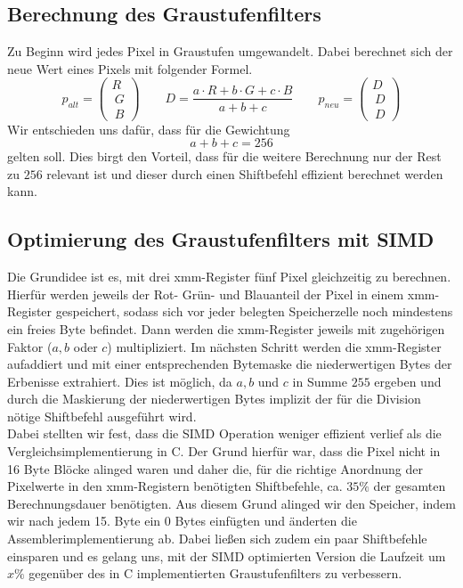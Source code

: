 \documentclass[course=erap]{aspdoc}
\begin{document}
\subsection{Berechnung des Graustufenfilters}
Zu Beginn wird jedes Pixel in Graustufen umgewandelt. Dabei berechnet sich der neue Wert eines Pixels mit folgender Formel.
\begin{equation}
\label{(2)}
p_{alt} =  \begin{pmatrix}R \\\ G \\\ B \end{pmatrix} \qquad D = \frac{a \cdot R  + b \cdot G  + c \cdot B }{a + b + c} \qquad p_{neu} =  \begin{pmatrix}D \\\ D \\\ D \end{pmatrix}
\end{equation}	
Wir entschieden uns dafür, dass für die Gewichtung \begin{equation}
a + b + c = 256
\end{equation} gelten soll. Dies birgt den Vorteil, dass für die weitere Berechnung nur der Rest zu $256$ relevant ist und dieser durch einen Shiftbefehl effizient berechnet werden kann.

\subsection{Optimierung des Graustufenfilters mit SIMD}
Die Grundidee ist es, mit drei xmm-Register fünf Pixel gleichzeitig zu berechnen. Hierfür werden jeweils der Rot- Grün- und Blauanteil der Pixel in einem xmm-Register gespeichert, sodass sich vor jeder belegten Speicherzelle noch mindestens ein freies Byte befindet. Dann werden die xmm-Register jeweils mit zugehörigen Faktor ($a,b$ oder $c$) multipliziert. Im nächsten Schritt werden die xmm-Register aufaddiert und mit einer entsprechenden Bytemaske die niederwertigen Bytes der Erbenisse extrahiert. Dies ist möglich, da $a,b$ und $c$ in Summe $255$ ergeben und durch die Maskierung der niederwertigen Bytes implizit der für die Division nötige Shiftbefehl ausgeführt wird.
\\
\newline
\noindent
Dabei stellten wir fest, dass die SIMD Operation weniger effizient verlief als die Vergleichsimplementierung in C. Der Grund hierfür war, dass die Pixel nicht in 16 Byte Blöcke alinged waren und daher die, für die richtige Anordnung der Pixelwerte in den xmm-Registern benötigten Shiftbefehle, ca. $35\%$ der gesamten Berechnungsdauer benötigten. Aus diesem Grund alinged wir den Speicher, indem wir nach jedem 15. Byte ein 0 Bytes einfügten und änderten die Assemblerimplementierung ab. Dabei ließen sich zudem ein paar Shiftbefehle einsparen und es gelang uns, mit der SIMD optimierten Version die Laufzeit um $x\%$ gegenüber des in C implementierten Graustufenfilters zu verbessern.  
  
\end{document}
